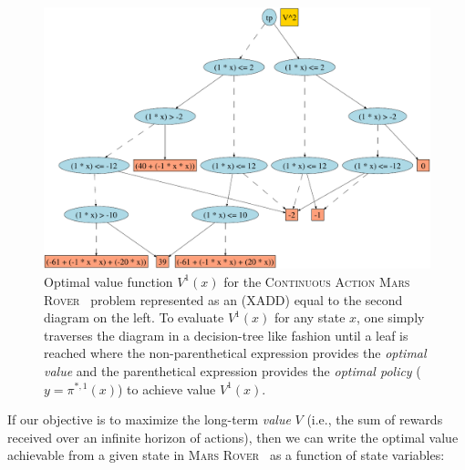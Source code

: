 \documentclass[twoside,11pt]{article}
\newcommand{\MarsRover}{\textsc{Mars Rover }}
\begin{document}
\begin{figure}[t!]
\begin{minipage}[b]{0.48\linewidth}
\end{minipage}
\begin{minipage}[b]{0.48\linewidth}
\includegraphics[width=1\textwidth]{Figures2/diagrams/roverdot.pdf}
\vspace{6mm}

\caption{\footnotesize Optimal value function $V^1(x)$ for the
\textsc{Continuous Action}  \MarsRover\ problem represented as an (XADD) equal to the second diagram on the left. 
To evaluate
$V^1(x)$ for any state $x$, one simply traverses the diagram in a
decision-tree like fashion until a leaf is reached where the
non-parenthetical expression provides the \emph{optimal value} and the
parenthetical expression provides the \emph{optimal policy} 
($y = \pi^{*,1}(x)$) to achieve value $V^1(x)$.}
\label{fig:opt_val_pol}
\vspace{-5mm}
\end{minipage}
\end{figure}
If our objective is to maximize the long-term \emph{value} $V$ (i.e.,
the sum of rewards received over an infinite horizon of actions), then
we can write the optimal value achievable from a given state in \MarsRover\ 
as a function of state variables:
\end{document}
